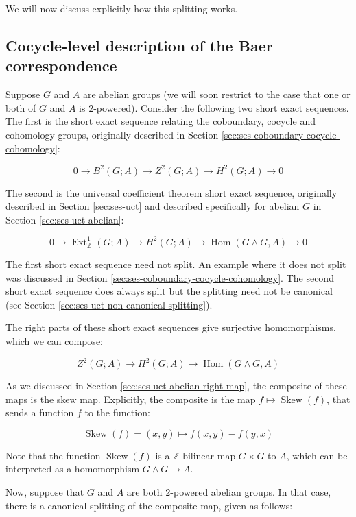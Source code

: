 We will now discuss explicitly how this splitting works.

\subsection{Cocycle-level description of the Baer correspondence}\label{sec:baer-correspondence-cocycle-level}

Suppose $G$ and $A$ are abelian groups (we will soon restrict to the
case that one or both of $G$ and $A$ is $2$-powered). Consider the
following two short exact sequences. The first is the short exact
sequence relating the coboundary, cocycle and cohomology groups,
originally described in Section
\ref{sec:ses-coboundary-cocycle-cohomology}:

$$0 \to B^2(G;A) \to Z^2(G;A) \to H^2(G;A) \to 0$$

The second is the universal coefficient theorem short exact sequence,
originally described in Section \ref{sec:ses-uct} and described
specifically for abelian $G$ in Section \ref{sec:ses-uct-abelian}:

$$0 \to \operatorname{Ext}^1_{\mathbb{Z}}(G;A) \to H^2(G;A) \to \operatorname{Hom}(G \wedge G,A) \to 0$$

The first short exact sequence need not split. An example where it
does not split was discussed in Section
\ref{sec:ses-coboundary-cocycle-cohomology}. The second short exact
sequence does always split but the splitting need not be canonical (see
Section \ref{sec:ses-uct-non-canonical-splitting}).

The right parts of these short exact sequences give surjective
homomorphisms, which we can compose:

$$Z^2(G;A) \to H^2(G;A) \to \operatorname{Hom}(G \wedge G,A)$$

As we discussed in Section \ref{sec:ses-uct-abelian-right-map}, the
composite of these maps is the skew map. Explicitly, the composite is
the map $f \mapsto \operatorname{Skew}(f)$, that sends a function $f$
to the function:

$$\operatorname{Skew}(f) = (x,y) \mapsto f(x,y) - f(y,x)$$

Note that the function $\operatorname{Skew}(f)$ is a
$\mathbb{Z}$-bilinear map $G \times G$ to $A$, which can be
interpreted as a homomorphism $G \wedge G \to A$.

Now, suppose that $G$ and $A$ are both $2$-powered abelian groups. In
that case, there is a canonical splitting of the composite map, given
as follows:

